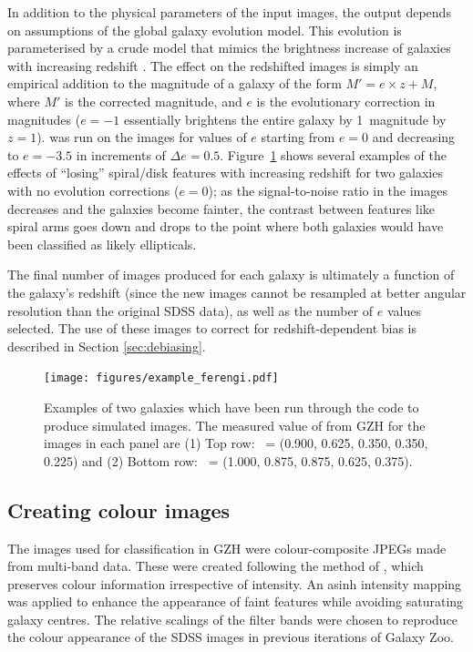 \documentclass[a4paper,fleqn,usenatbib]{mnras}
\begin{document}
%

In addition to the physical parameters of the input images, the \ferengi{}
output depends on assumptions of the global galaxy evolution model.
This evolution is parameterised by a crude model that mimics the brightness increase of galaxies
with increasing redshift \citep[\eg,][]{lil98,lov12}. The effect on the
redshifted images is simply an empirical addition to the magnitude of a galaxy
of the form $M' = e\times z + M$, where $M'$ is the corrected magnitude, and
$e$ is the evolutionary correction in magnitudes ($e=-1$ essentially
brightens the entire galaxy by 1~magnitude by $z=1$). \ferengi{} was run on the images
for values of $e$ starting from $e=0$ and decreasing to $e=-3.5$ in increments
of $\Delta e = 0.5$. Figure~\ref{fig:exampleFERENGI} shows several examples
of the effects of ``losing'' spiral/disk features with increasing redshift
for two galaxies with no evolution corrections ($e=0$); as the signal-to-noise ratio in the images
decreases and the galaxies become fainter, the contrast between features
like spiral arms goes down and \ffeatures{} drops to the point where both
galaxies would have been classified as likely ellipticals. 

The final number of \ferengi{} images produced for each galaxy is ultimately a
function of the galaxy's redshift (since the new images cannot be resampled at
better angular resolution than the original SDSS data), as well as the number
of $e$ values selected. The use of these images to correct for redshift-dependent
bias is described in Section \ref{sec:debiasing}.

%

\begin{figure}
\center
\texttt{[image: figures/example\_ferengi.pdf]}
\caption{Examples of two galaxies which have been run through the \ferengi{}
code to produce simulated \hst{} images. The measured value of \ffeatures{}
from GZH for the images in each panel are (1) Top row: \ffeatures~= (0.900,
0.625, 0.350, 0.350, 0.225) and (2) Bottom row: \ffeatures~= (1.000, 0.875,
0.875, 0.625, 0.375). \label{fig:exampleFERENGI}}
\end{figure}

\subsection{Creating colour images}\label{ssec:images}

The images used for classification in GZH were colour-composite JPEGs made from
multi-band data. These were created following the method of \citet{lup04}, which
preserves colour information irrespective of intensity.  An asinh intensity
mapping was applied to enhance the appearance of faint features while avoiding
saturating galaxy centres. The relative scalings of the filter bands were
chosen to reproduce the colour appearance of the SDSS images in
previous iterations of Galaxy Zoo.
\end{document}
